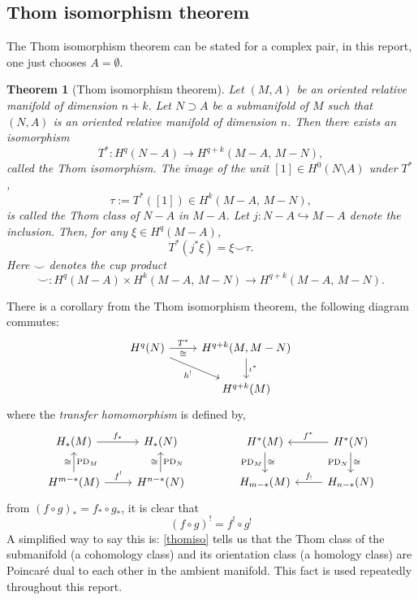 \documentclass[a4paper,11pt]{article}
\newtheorem{theorem}{Theorem}[section]
\theoremstyle{definition}
\theoremstyle{remark}
\begin{document}
\subsection{Thom isomorphism theorem}
The Thom isomorphism theorem can be stated for a complex pair, in this report, one just chooses $A=\emptyset$.
\label{Thom}
\begin{theorem}[Thom isomorphism theorem]\label{thm:thom-iso}
	Let $(M,A)$ be an oriented relative manifold of dimension $n+k$.
	Let $N\supset A$ be a submanifold of $M$ such that $(N,A)$ is an oriented relative manifold of dimension $n$.
	Then there exists an isomorphism
	$$
	T^*\colon H^q(N- A)\longrightarrow H^{q+k}(M- A,\,M- N),
	$$
	called the Thom isomorphism.
	The image of the unit $[1]\in H^0(N\setminus A)$ under $T^*$,
	$$
	\tau:=T^*([1])\in H^k(M- A,\,M- N),
	$$
	is called the Thom class of $N- A$ in $M-A$.
	Let $j\colon N- A\hookrightarrow M-A$ denote the inclusion.
	Then, for any $\xi\in H^q(M-A)$,
	\begin{equation}
		\label{Tiso}
		T^*(j^*\xi)=\xi\smile\tau.
	\end{equation}
	Here $\smile$ denotes the cup product
	$$
	\smile\colon H^q(M-A)\times H^k(M- A,\,M- N)\longrightarrow H^{q+k}(M-A,\,M- N).
	$$
\end{theorem}
There is a corollary \cite[\S 5 推论 7.2]{jiang} from the Thom isomorphism theorem, the following diagram commutes:
\begin{equation}
	\label{thomiso}
	\begin{tikzcd}
		{H^q(N)} & {H^{q+k}(M,M-N)} \\
		& {H^{q+k}(M)}
		\arrow["{T^*}","\cong"', from=1-1, to=1-2]
		\arrow["{h^!}"', from=1-1, to=2-2]
		\arrow["{\iota^*}", from=1-2, to=2-2]
	\end{tikzcd}
\end{equation}
where the {\itshape transfer homomorphism} is defined by,
$$
\begin{tikzcd}
	H_*(M) \arrow[r, "f_*"] & H_*(N) \\
	H^{m-*}(M)
	\arrow[u, "\operatorname{PD}_M"' , "\cong"]
	\arrow[r, "f^!"] &
	H^{n-*}(N)
	\arrow[u, "\operatorname{PD}_N"' , "\cong"]
\end{tikzcd}
\qquad\qquad
\begin{tikzcd}
	H^*(M) \arrow[d, "\operatorname{PD}_M"', "\cong"] & 
	H^*(N) \arrow[l, "f^*"'] \arrow[d, "\operatorname{PD}_N"', "\cong"] \\
	H_{m-*}(M) &
	H_{n-*}(N) \arrow[l, "f_!"']
\end{tikzcd}
$$
from $(f\circ g)_*=f_*\circ g_*$, it is clear that
\begin{equation}
	\label{nature}
	(f\circ g)^!=f^!\circ g^!
\end{equation}
A simplified way to say this is: \cref{thomiso} tells us that the Thom class of the submanifold (a cohomology class) and its orientation class (a homology class) are Poincar\'e dual to each other in the ambient manifold. This fact is used repeatedly throughout this report.
\end{document}

